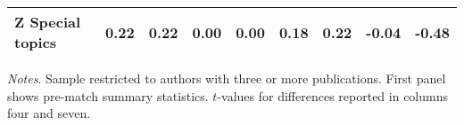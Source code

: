 \begin{table}[H]
\begin{adjustwidth}{-0.6cm}{}
\begin{threeparttable}
\begin{tabular}{p{3.55cm}S@{}S@{}S@{}S@{}S@{}S@{}S@{}S@{}}
            \quad Z Special topics&        0.22&        0.22&        0.00&        0.00&        0.18&        0.22&       -0.04&       -0.48\\
            \bottomrule
        \end{tabular}
        \begin{tablenotes}
            \tiny
            \item \textit{Notes}. Sample restricted to authors with three or more publications. First panel shows pre-match summary statistics. \(t\)-values for differences reported in columns four and seven.
        \end{tablenotes}
    \end{threeparttable}
    \end{adjustwidth}
\end{table}